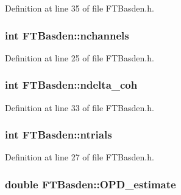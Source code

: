 Definition at line 35 of file FTBasden.h.

\hypertarget{classFTBasden_a5f79935ce61595d637dc6c05071dbc9c}{
\subsubsection[{nchannels}]{\setlength{\rightskip}{0pt plus 5cm}int {\bf FTBasden::nchannels}}}
\label{classFTBasden_a5f79935ce61595d637dc6c05071dbc9c}


Definition at line 25 of file FTBasden.h.

\hypertarget{classFTBasden_ad4f3178302c51d384fd6982291b1c013}{
\subsubsection[{ndelta\_\-coh}]{\setlength{\rightskip}{0pt plus 5cm}int {\bf FTBasden::ndelta\_\-coh}}}
\label{classFTBasden_ad4f3178302c51d384fd6982291b1c013}


Definition at line 33 of file FTBasden.h.

\hypertarget{classFTBasden_a427aed6fcb0f1e47aa7c3f074e135881}{
\subsubsection[{ntrials}]{\setlength{\rightskip}{0pt plus 5cm}int {\bf FTBasden::ntrials}}}
\label{classFTBasden_a427aed6fcb0f1e47aa7c3f074e135881}


Definition at line 27 of file FTBasden.h.

\hypertarget{classFTBasden_a306a1bc5d8932b9eb3ba98d670ea631b}{
\subsubsection[{OPD\_\-estimate}]{\setlength{\rightskip}{0pt plus 5cm}double {\bf FTBasden::OPD\_\-estimate}}}
\label{classFTBasden_a306a1bc5d8932b9eb3ba98d670ea631b}


